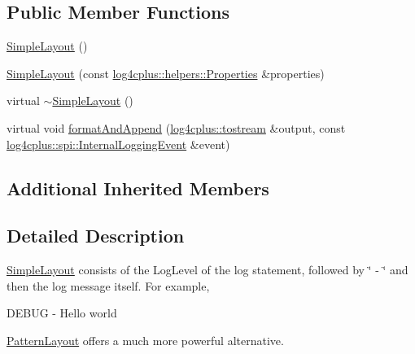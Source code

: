 \subsection*{Public Member Functions}
\begin{DoxyCompactItemize}
\item 
\hyperlink{classlog4cplus_1_1SimpleLayout_a662351ce25fe66ab5ec932c424308588}{Simple\-Layout} ()
\item 
\hyperlink{classlog4cplus_1_1SimpleLayout_ab3fe1291cec755599b09f2e19075be46}{Simple\-Layout} (const \hyperlink{classlog4cplus_1_1helpers_1_1Properties}{log4cplus\-::helpers\-::\-Properties} \&properties)
\item 
virtual \hyperlink{classlog4cplus_1_1SimpleLayout_a0c10406a3b13a5bc5a07ca2bf0766e70}{$\sim$\-Simple\-Layout} ()
\item 
virtual void \hyperlink{classlog4cplus_1_1SimpleLayout_ad9b1bd2e2b87c03af6eed27258ddb386}{format\-And\-Append} (\hyperlink{namespacelog4cplus_aef9e0c9a1adafed82c39fdef478716e1}{log4cplus\-::tostream} \&output, const \hyperlink{classlog4cplus_1_1spi_1_1InternalLoggingEvent}{log4cplus\-::spi\-::\-Internal\-Logging\-Event} \&event)
\end{DoxyCompactItemize}
\subsection*{Additional Inherited Members}


\subsection{Detailed Description}
\hyperlink{classlog4cplus_1_1SimpleLayout}{Simple\-Layout} consists of the Log\-Level of the log statement, followed by \char`\"{} -\/ \char`\"{} and then the log message itself. For example,


\begin{DoxyPre}
        DEBUG - Hello world
\end{DoxyPre}


\hyperlink{classlog4cplus_1_1PatternLayout}{Pattern\-Layout} offers a much more powerful alternative. 

